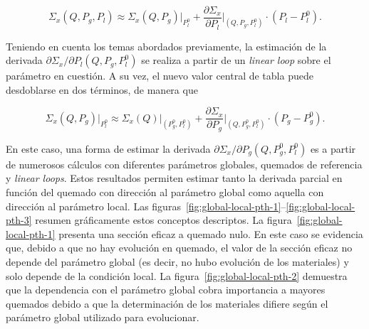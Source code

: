 \documentclass[11pt]{article}
\begin{document}
\begin{equation} \label{ec:aprox-general-2}
 \Sigma_x \left( Q, P_g, P_l   \right) \approx 
 \Sigma_x \left( Q, P_g        \right)\bigg|_{P^0_l} +
 \frac{\partial\Sigma_x}{\partial P_l}\bigg|_{\left( Q, P_g, P^0_l \right)} \cdot \left(P_l - P^0_l \right).
\end{equation}

\noindent
Teniendo en cuenta los temas abordados previamente, la estimación de la derivada $\partial\Sigma_x / \partial P_l \left( Q, P_g, P^0_l \right)$ se realiza a partir de un \emph{linear loop} sobre el parámetro en cuestión. A su vez, el nuevo valor central de tabla puede desdoblarse en dos términos, de manera que

\begin{equation} \label{ec:aprox-general-3}
 \Sigma_x \left( Q, P_g \right)\bigg|_{P^0_l} \approx
 \Sigma_x \left( Q \right)\bigg|_{\left( P^0_g, P^0_l \right)} +
 \frac{\partial\Sigma_x}{\partial P_g}\bigg|_{\left( Q, P^0_g, P^0_l \right)} \cdot \left(P_g - P^0_g \right).
\end{equation}

\noindent
En este caso, una forma de estimar la derivada $\partial\Sigma_x / \partial P_g \left( Q, P^0_g, P^0_l \right)$ es a partir de numerosos cálculos con diferentes parámetros globales, quemados de referencia y \emph{linear loops}. Estos resultados permiten estimar tanto la derivada parcial en función del quemado con dirección al parámetro global como aquella con dirección al parámetro local. Las figuras~\ref{fig:global-local-pth-1}--\ref{fig:global-local-pth-3} resumen gráficamente estos conceptos descriptos. La figura~\ref{fig:global-local-pth-1} presenta una sección eficaz a quemado nulo. En este caso se evidencia que, debido a que no hay evolución en quemado, el valor de la sección eficaz no depende del parámetro global (es decir, no hubo evolución de los materiales) y solo depende de la condición local. La figura~\ref{fig:global-local-pth-2} demuestra que la dependencia con el parámetro global cobra importancia a mayores quemados debido a que la determinación de los materiales difiere según el parámetro global utilizado para evolucionar.
\end{document}
